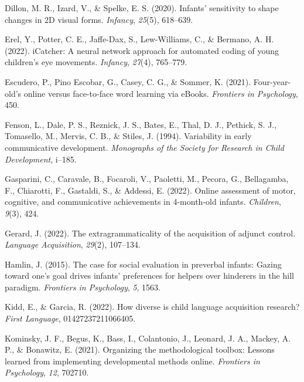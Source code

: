 \documentclass[
  man,floatsintext]{apa6}
\newlength{\cslhangindent}
\newlength{\cslentryspacingunit} %
\newenvironment{CSLReferences}[2] %
 {%
  \setlength{\parindent}{0pt}
  \ifodd #1
  \let\oldpar\par
  \def\par{\hangindent=\cslhangindent\oldpar}
  \fi
  \setlength{\parskip}{#2\cslentryspacingunit}
 }%
 {}
\begin{document}
\begin{CSLReferences}{1}{0}
\leavevmode{}%
Dillon, M. R., Izard, V., \& Spelke, E. S. (2020). Infants' sensitivity to shape changes in 2D visual forms. \emph{Infancy}, \emph{25}(5), 618--639.

\leavevmode{}%
Erel, Y., Potter, C. E., Jaffe-Dax, S., Lew-Williams, C., \& Bermano, A. H. (2022). iCatcher: A neural network approach for automated coding of young children's eye movements. \emph{Infancy}, \emph{27}(4), 765--779.

\leavevmode{}%
Escudero, P., Pino Escobar, G., Casey, C. G., \& Sommer, K. (2021). Four-year-old's online versus face-to-face word learning via eBooks. \emph{Frontiers in Psychology}, 450.

\leavevmode{}%
Fenson, L., Dale, P. S., Reznick, J. S., Bates, E., Thal, D. J., Pethick, S. J., Tomasello, M., Mervis, C. B., \& Stiles, J. (1994). Variability in early communicative development. \emph{Monographs of the Society for Research in Child Development}, i--185.

\leavevmode{}%
Gasparini, C., Caravale, B., Focaroli, V., Paoletti, M., Pecora, G., Bellagamba, F., Chiarotti, F., Gastaldi, S., \& Addessi, E. (2022). Online assessment of motor, cognitive, and communicative achievements in 4-month-old infants. \emph{Children}, \emph{9}(3), 424.

\leavevmode{}%
Gerard, J. (2022). The extragrammaticality of the acquisition of adjunct control. \emph{Language Acquisition}, \emph{29}(2), 107--134.

\leavevmode{}%
Hamlin, J. (2015). The case for social evaluation in preverbal infants: Gazing toward one's goal drives infants' preferences for helpers over hinderers in the hill paradigm. \emph{Frontiers in Psychology}, \emph{5}, 1563.

\leavevmode{}%
Kidd, E., \& Garcia, R. (2022). How diverse is child language acquisition research? \emph{First Language}, 01427237211066405.

\leavevmode{}%
Kominsky, J. F., Begus, K., Bass, I., Colantonio, J., Leonard, J. A., Mackey, A. P., \& Bonawitz, E. (2021). Organizing the methodological toolbox: Lessons learned from implementing developmental methods online. \emph{Frontiers in Psychology}, \emph{12}, 702710.


\end{CSLReferences}
\end{document}
